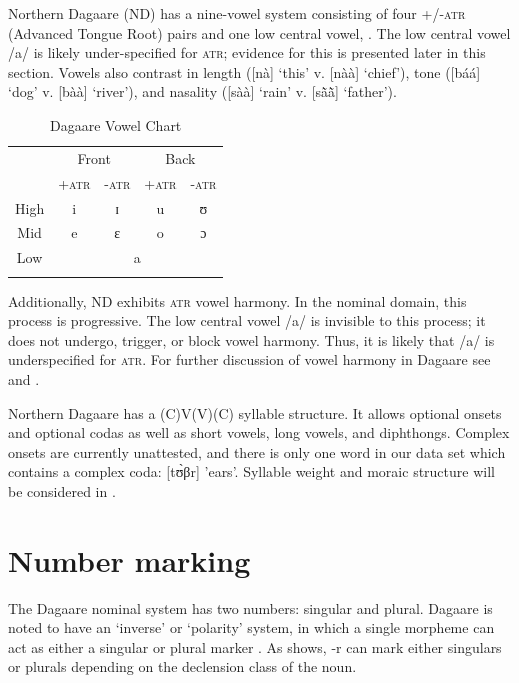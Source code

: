 \documentclass[output=paper,colorlinks,citecolor=brown,
]{langscibook}
\begin{document}
Northern Dagaare (ND) has a nine-vowel system consisting of four +/-\textsc{atr} (Advanced Tongue Root)  pairs and one low central vowel, . The low central vowel /a/ is likely under-specified for \textsc{atr}; evidence for this is presented later in this section.  Vowels also contrast in length ([nà] ‘this’ v. [nàà] ‘chief’), tone ([báá] ‘dog’ v. [bàà] ‘river’), and nasality ([sàà] ‘rain’ v. [sã̀ã̀] ‘father’). 

\begin{table}
\begin{tabular}{ccccc}
    \lsptoprule 
  {}  & \multicolumn{2}{c}{Front} & \multicolumn{2}{c}{Back} \\
  {}  & +\textsc{atr} &-\textsc{atr} &+\textsc{atr} &-\textsc{atr} \\
    \midrule \midrule
    High & i & ɪ & u & ʊ \\
    Mid & e & ɛ & o & ɔ \\
    Low & \multicolumn{4}{c}{a} \\
    \lspbottomrule 
\end{tabular}
\caption{Dagaare Vowel Chart} \label{tab:caragine:VowelChart}
\end{table}

Additionally, ND exhibits \textsc{atr} vowel harmony. In the nominal domain, this process is progressive. The low central vowel /a/ is invisible to this process; it does not undergo, trigger, or block vowel harmony. Thus, it is likely that /a/ is underspecified for \textsc{atr}. For further discussion of vowel harmony in  Dagaare see \citet{bodomoStructure1997} and \citet{aliDictionary2021}.

 Northern Dagaare has a (C)V(V)(C) syllable structure. It allows optional onsets and optional codas as well as short vowels, long vowels, and diphthongs. Complex onsets are currently unattested, and there is only one word in our data set which contains a complex coda: [tʊ̀βr] 'ears'. Syllable weight and moraic structure will be considered in .

\section{Number marking} \label{sec:caragine:numberMarking}

The Dagaare nominal system has two numbers: singular and plural. Dagaare is noted to have an `inverse' or `polarity' system, in which a single morpheme can act as either a singular or plural marker \citep{Grimm2012, Grimm2021, anttilaProsodic2009}. As  shows, -r can mark either singulars or plurals depending on the declension class of the noun.
\end{document}

